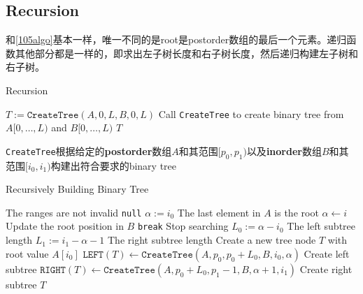 \subsection{Recursion}
和\ref{105algo}基本一样，唯一不同的是root是postorder数组的最后一个元素。递归函数其他部分都是一样的，即求出左子树长度和右子树长度，然后递归构建左子树和右子树。
\setcounter{algorithm}{0}
\begin{algorithm}[H]
\caption{Recursion}
\begin{algorithmic}[1]
\State $T:=\texttt{CreateTree}(A, 0, L, B, 0, L)$ \Comment Call \texttt{CreateTree} to create binary tree from $A[0,\ldots, L)$ and $B[0,\ldots,L)$
\State \Return $T$
\EndProcedure
\end{algorithmic}
\end{algorithm}
\texttt{CreateTree}根据给定的\textbf{postorder}数组$A$和其范围$[p_0, p_1)$以及\textbf{inorder}数组$B$和其范围$[i_0, i_1)$构建出符合要求的binary tree
\begin{algorithm}[H]
\caption{Recursively Building Binary Tree}
\begin{algorithmic}[1]
 \Comment The ranges are not invalid
\State \Return \texttt{null}
\EndIf
\State $\alpha:=i_0$
 \Comment The last element in $A$ is the root
\State $\alpha\gets i$ \Comment Update the root position in $B$
\State \texttt{break} \Comment Stop searching
\EndIf
\EndFor
\State $L_0:=\alpha - i_0$ \Comment The left subtree length
\State $L_1:=i_1 - \alpha - 1$ \Comment The right subtree length
\State Create a new tree node $T$ with root value $A[i_0]$
\State $\texttt{LEFT}(T)\gets \texttt{CreateTree}(A, p_0, p_0+L_0, B, i_0, \alpha)$ \Comment Create left subtree
\State $\texttt{RIGHT}(T) \gets \texttt{CreateTree}(A, p_0+L_0, p_1-1, B, \alpha+1, i_1)$ \Comment Create right subtree
\State \Return $T$
\EndFunction
\end{algorithmic}
\end{algorithm}
